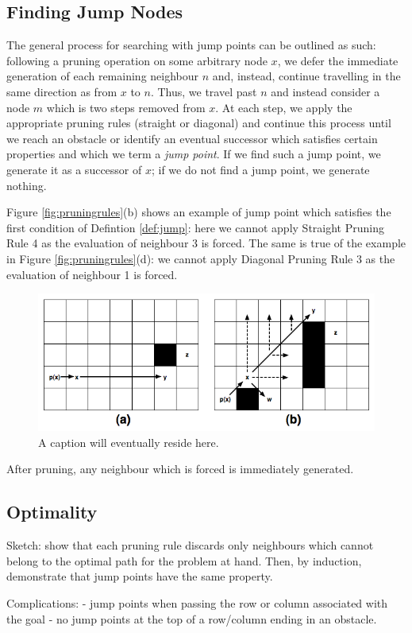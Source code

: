 \subsection{Finding Jump Nodes}
The general process for searching with jump points can be outlined as 
such: following a pruning operation on some arbitrary node $x$, we defer the immediate 
generation of each remaining neighbour $n$ and, instead, continue travelling in the same direction as from $x$
to $n$.
Thus, we travel past $n$ and instead consider a node $m$ which is two steps
removed from $x$.
At each step, we apply the appropriate pruning rules (straight or
diagonal) and continue this process until we reach an obstacle or identify an 
eventual successor which satisfies certain properties and which we term a 
\emph{jump point}.
If we find such a jump point, we generate it as a successor of $x$; if we do not 
find a jump point, we generate nothing.


\noindent
Figure \ref{fig:pruningrules}(b) shows an example of jump point which satisfies the
first condition of Defintion \ref{def:jump}: here we cannot apply Straight Pruning
Rule 4 as the evaluation of neighbour 3 is forced.
The same is true of the example in Figure \ref{fig:pruningrules}(d): we cannot
apply Diagonal Pruning Rule 3 as the evaluation of neighbour 1 is forced.



\begin{figure}[tb]
       \begin{center}
		   \includegraphics[scale=0.35, trim = 10mm 10mm 10mm 0mm]
			{diagrams/jumppoints.png}
       \end{center}
	\vspace{-3pt}
       \caption{A caption will eventually reside here.}
       \label{fig:jumppoints}
\end{figure}



After pruning, any neighbour which is forced is immediately generated.

\subsection{Optimality}
Sketch: show that each pruning rule discards only neighbours
which cannot belong to the optimal path for the problem at hand.
Then, by induction, demonstrate that jump points have the same 
property. 

Complications:
 - jump points when passing the row or column associated with the goal
 - no jump points at the top of a row/column ending in an obstacle.

